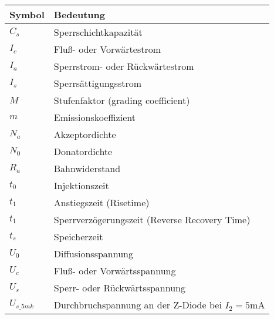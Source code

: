 \documentclass[
	a4paper, %
	12pt, %
]{CSUniSchoolLabReport}
\begin{document}
\begin{table}[h]
\centering
\begin{tabular}{ll}
\toprule
\textbf{Symbol} & \textbf{Bedeutung} \\
\midrule
$C_s$    & Sperrschichtkapazität \\
$I_c$    & Fluß- oder Vorwärtestrom \\
$I_a$    & Sperrstrom- oder Rückwärtestrom \\
$I_s$    & Sperrsättigungsstrom \\
$M$      & Stufenfaktor (grading coefficient) \\
$m$      & Emissionskoeffizient \\
$N_a$    & Akzeptordichte \\
$N_0$    & Donatordichte \\
$R_a$    & Bahnwiderstand \\
$t_0$    & Injektionszeit \\
$t_1$    & Anstiegszeit (Risetime) \\
$t_1$    & Sperrverzögerungszeit (Reverse Recovery Time) \\
$t_s$    & Speicherzeit \\
$U_0$    & Diffusionsspannung \\
$U_c$    & Fluß- oder Vorwärtsspannung \\
$U_s$    & Sperr- oder Rückwärtsspannung \\
$U_{s\_5mk}$ & Durchbruchspannung an der Z-Diode bei $I_2 = 5$mA \\
\bottomrule
\end{tabular}
\end{table}


\printbibliography %
\clearpage


\end{document}
